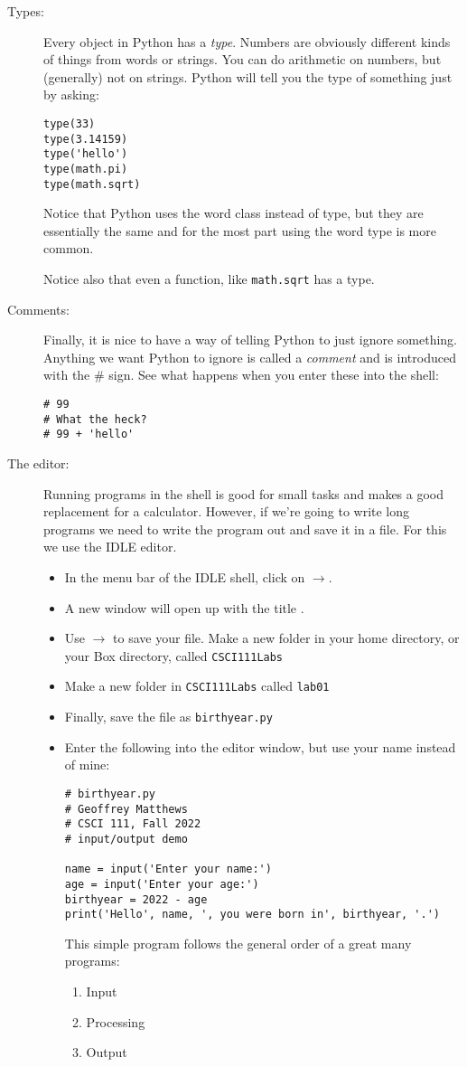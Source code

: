 \documentclass[12pt]{article}
\begin{document}
\begin{description}
\item[Types:]  Every object in Python has a {\em type}.
Numbers are obviously different kinds of things from
words or strings.  You can do arithmetic on numbers, but (generally)
not on strings.  Python will tell you the type of something
just by asking:
\begin{Verbatim}[frame=single]
type(33)
type(3.14159)
type('hello')
type(math.pi)
type(math.sqrt)
\end{Verbatim}
Notice that Python uses the word class instead of type,
but they are essentially the same and for the most part
using the word type is more common.

Notice also that even a function, like \verb|math.sqrt|
has a type. 

\item[Comments:] Finally, it is nice to have a way
of telling Python to just ignore something.
Anything we want Python to ignore is called 
a {\em comment} and is introduced with the \# sign.
See what happens when you enter these into the shell:
\begin{Verbatim}[frame=single]
# 99
# What the heck?
# 99 + 'hello'
\end{Verbatim}

\item[The editor:]  Running programs in the shell
is good for small tasks and makes a good replacement for
a calculator.  However, if we're going to write long
programs we need to write the program out and save
it in a file.  For this we use the IDLE editor.
\begin{itemize}
\item In the menu bar of the IDLE shell, click on
$\rightarrow$.
\item A new window will open up with the title .
\item Use $\rightarrow$ to
save your file.  Make a new folder in your home directory,
or your Box directory, called \verb|CSCI111Labs|
\item Make a new folder in \verb|CSCI111Labs| called
\verb|lab01|
\item Finally, save the file as \verb|birthyear.py|
\item Enter the following into the editor window,
but use your name instead of mine:
\begin{Verbatim}[frame=single]
# birthyear.py
# Geoffrey Matthews
# CSCI 111, Fall 2022
# input/output demo

name = input('Enter your name:')
age = input('Enter your age:')
birthyear = 2022 - age
print('Hello', name, ', you were born in', birthyear, '.')
\end{Verbatim}
This simple program follows the general order
of a great many programs:
\begin{enumerate}
\item Input
\item Processing
\item Output
\end{enumerate}


\end{itemize}
\end{description}
\end{document}
